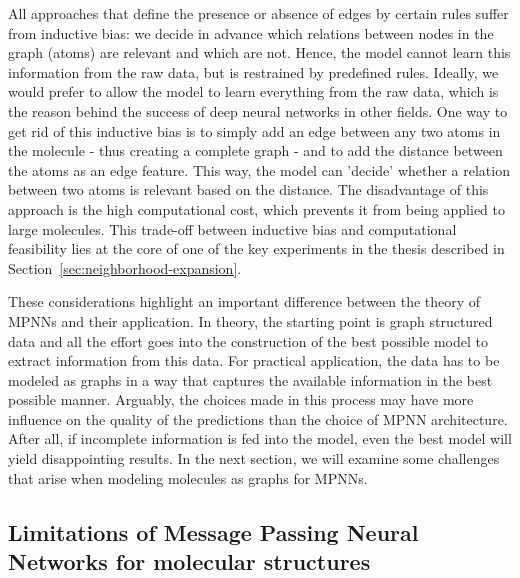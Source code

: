 All approaches that define the presence or absence of edges by certain rules suffer from inductive bias: we decide in advance which relations between nodes in the graph (atoms) are relevant and which are not. Hence, the model cannot learn this information from the raw data, but is restrained by predefined rules. Ideally, we would prefer to allow the model to learn everything from the raw data, which is the reason behind the success of deep neural networks in other fields. One way to get rid of this inductive bias is to simply add an edge between any two atoms in the molecule - thus creating a complete graph - and to add the distance between the atoms as an edge feature. This way, the model can 'decide' whether a relation between two atoms is relevant based on the distance. The disadvantage of this approach is the high computational cost, which prevents it from being applied to large molecules. This trade-off between inductive bias and computational feasibility lies at the core of one of the key experiments in the thesis described in Section~\ref{sec:neighborhood-expansion}.

%

These considerations highlight an important difference between the theory of MPNNs and their application. In theory, the starting point is graph structured data and all the effort goes into the construction of the best possible model to extract information from this data. For practical application, the data has to be modeled as graphs in a way that captures the available information in the best possible manner. Arguably, the choices made in this process may have more influence on the quality of the predictions than the choice of MPNN architecture. After all, if incomplete information is fed into the model, even the best model will yield disappointing results. In the next section, we will examine some challenges that arise when modeling molecules as graphs for MPNNs.


\subsection{Limitations of Message Passing Neural Networks for molecular structures}
\label{sec:limitations}

